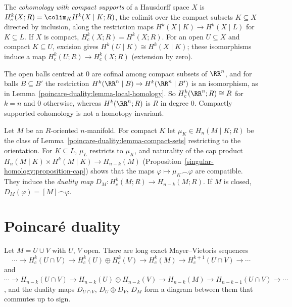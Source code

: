 \begin{definition}\label{poincare-duality:definition-compact-supports}
The \emph{cohomology with compact supports} of a Hausdorff space $X$ is $H^k_c(X; R) = \colim_K H^k(X \mid K; R)$, the colimit over the compact subsets $K \subseteq X$
directed by inclusion, along the restriction maps $H^k(X \mid K) \to H^k(X \mid L)$ for $K \subseteq L$. If $X$ is compact, $H^k_c(X; R) = H^k(X; R)$. For an open
$U \subseteq X$ and compact $K \subseteq U$, excision gives $H^k(U \mid K) \cong H^k(X \mid K)$; these isomorphisms induce a map $H^k_c(U; R) \to H^k_c(X; R)$ (extension by zero).
\end{definition}

\begin{example}\label{poincare-duality:example-compact-supports-rn}
The open balls centred at $0$ are cofinal among compact subsets of $\RR^n$, and for balls $B \subseteq B'$ the restriction $H^k(\RR^n \mid B) \to H^k(\RR^n \mid B')$ is an
isomorphism, as in Lemma~\ref{poincare-duality:lemma-local-homology}. So $H^k_c(\RR^n; R) \cong R$ for $k = n$ and $0$ otherwise, whereas $H^k(\RR^n; R)$ is $R$ in degree $0$.
Compactly supported cohomology is not a homotopy invariant.
\end{example}

\begin{definition}\label{poincare-duality:definition-duality-map}
Let $M$ be an $R$-oriented $n$-manifold. For compact $K$ let $\mu_K \in H_n(M \mid K; R)$ be the class of Lemma~\ref{poincare-duality:lemma-compact-sets} restricting to the
orientation. For $K \subseteq L$, $\mu_L$ restricts to $\mu_K$, and naturality of the cap product
$H_n(M \mid K) \times H^k(M \mid K) \to H_{n-k}(M)$ (Proposition~\ref{singular-homology:proposition-cap}) shows that the maps $\varphi \mapsto \mu_K \frown \varphi$ are compatible.
They induce the \emph{duality map} $D_M \colon H^k_c(M; R) \to H_{n-k}(M; R)$. If $M$ is closed, $D_M(\varphi) = [M] \frown \varphi$.
\end{definition}

\section{Poincar\'e duality}\label{poincare-duality:section-poincare-duality}

\begin{lemma}\label{poincare-duality:lemma-mayer-vietoris-duality}
Let $M = U \cup V$ with $U$, $V$ open. There are long exact Mayer--Vietoris sequences
\[
\cdots \to H^k_c(U \cap V) \to H^k_c(U) \oplus H^k_c(V) \to H^k_c(M) \to H^{k+1}_c(U \cap V) \to \cdots
\]
and $\cdots \to H_{n-k}(U \cap V) \to H_{n-k}(U) \oplus H_{n-k}(V) \to H_{n-k}(M) \to H_{n-k-1}(U \cap V) \to \cdots$, and the duality maps $D_{U \cap V}$, $D_U \oplus D_V$, $D_M$
form a diagram between them that commutes up to sign.
\end{lemma}

